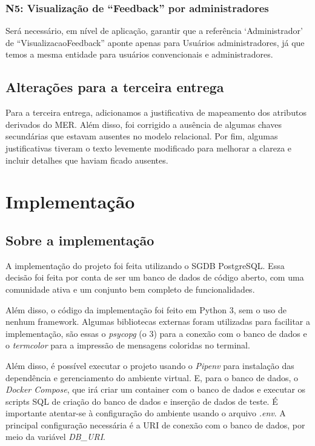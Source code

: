 \subsection{\textbf{N5:} Visualização de ``Feedback'' por administradores}

Será necessário, em nível de aplicação, garantir que a referência
`Administrador' de ``VisualizacaoFeedback'' aponte apenas para Usuários
administradores, já que temos a mesma entidade para usuários convencionais e
administradores.

\section{Alterações para a terceira entrega}

Para a terceira entrega, adicionamos a justificativa de mapeamento dos atributos
derivados do MER. Além disso, foi corrigido a ausência de algumas chaves 
secundárias que estavam ausentes no modelo relacional. Por fim, algumas 
justificativas tiveram o texto levemente modificado para melhorar a clareza e incluir
detalhes que haviam ficado ausentes.


\chapter{Implementação}


\section{Sobre a implementação}

A implementação do projeto foi feita utilizando o SGDB PostgreSQL. Essa decisão foi
feita por conta de ser um banco de dados de código aberto, com uma comunidade ativa
e um conjunto bem completo de funcionalidades. 

Além disso, o código da implementação foi feito em Python 3, sem o uso de nenhum
framework. Algumas bibliotecas externas foram utilizadas para facilitar a implementação,
são essas o \textit{psycopg} (o 3) para a conexão com o banco de dados e o \textit{termcolor}
para a impressão de mensagens coloridas no terminal.

Além disso, é possível executar o projeto usando o \textit{Pipenv} para instalação
das dependência e gerenciamento do ambiente virtual. E, para o banco de dados, o \textit{Docker
Compose}, que irá criar um container com o banco de dados e executar os scripts SQL
de criação do banco de dados e inserção de dados de teste. É importante atentar-se à
configuração do ambiente usando o arquivo \textit{.env}. A principal configuração
necessária é a URI de conexão com o banco de dados, por meio da variável \textit{DB\_URI}.

